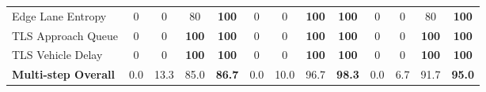 \begin{table}[t]
{\begin{tabular}{l|cccc|cccc|cccc}
Edge Lane Entropy           & 0 & 0 & 80 & \textbf{100} & 0 & 0 & \textbf{100} & \textbf{100} & 0 & 0 & 80 & \textbf{100} \\
TLS Approach Queue          & 0 & 0 & \textbf{100} & \textbf{100} & 0 & 0 & \textbf{100} & \textbf{100} & 0 & 0 & \textbf{100} & \textbf{100} \\
TLS Vehicle Delay           & 0 & 0 & \textbf{100} & \textbf{100} & 0 & 0 & \textbf{100} & \textbf{100} & 0 & 0 & \textbf{100} & \textbf{100} \\
\cmidrule(lr){1-13}
\textbf{Multi-step Overall} & 0.0 & 13.3 & 85.0 & \textbf{86.7} & 0.0 & 10.0 & 96.7 & \textbf{98.3} & 0.0 & 6.7 & 91.7 & \textbf{95.0} \\
\bottomrule
\end{tabular}%
}
\end{table}

